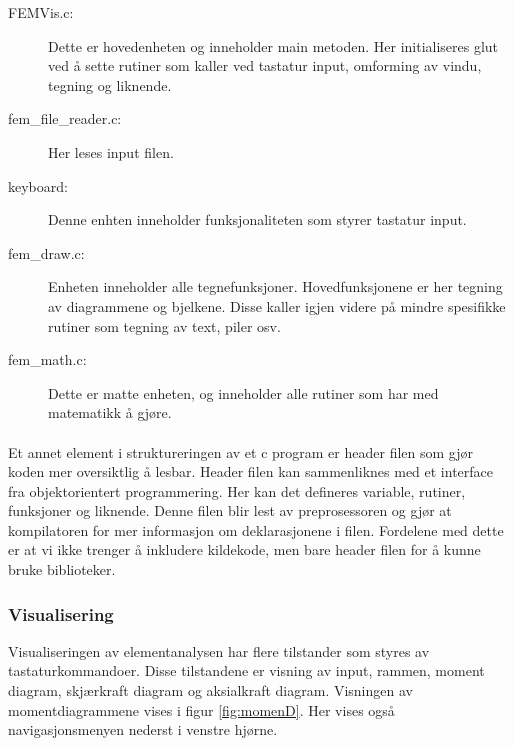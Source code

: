 \documentclass[10pt,a4paper, norsk]{article}
\begin{document}
\begin{description}
\item[FEMVis.c:] Dette er hovedenheten og inneholder main metoden. Her initialiseres glut ved å sette rutiner som kaller ved tastatur input, omforming av vindu, tegning og liknende. 
\item[fem\_file\_reader.c:] Her leses input filen.
\item[keyboard:] Denne enhten inneholder funksjonaliteten som styrer tastatur input.
\item[fem\_draw.c:] Enheten inneholder alle tegnefunksjoner. Hovedfunksjonene er her tegning av diagrammene og bjelkene. Disse kaller igjen videre på mindre spesifikke rutiner som tegning av text, piler osv.
\item[fem\_math.c:] Dette er matte enheten, og inneholder alle rutiner som har med matematikk å gjøre. 
\end{description}

\paragraph*{	}
Et annet element i struktureringen av et c program er header filen som gjør koden mer oversiktlig å lesbar. Header filen kan sammenliknes med et interface fra objektorientert programmering. Her kan det defineres variable, rutiner, funksjoner og liknende. Denne filen blir lest av preprosessoren og gjør at kompilatoren for mer informasjon om deklarasjonene i filen. Fordelene med dette er at vi ikke trenger å inkludere kildekode, men bare header filen for å kunne bruke biblioteker.


\subsubsection{Visualisering}
Visualiseringen av elementanalysen har flere tilstander som styres av tastaturkommandoer. Disse tilstandene er visning av input, rammen, moment diagram, skjærkraft diagram og aksialkraft diagram. Visningen av momentdiagrammene vises i figur \ref{fig:momenD}. Her vises også navigasjonsmenyen nederst i venstre hjørne.
\end{document}
